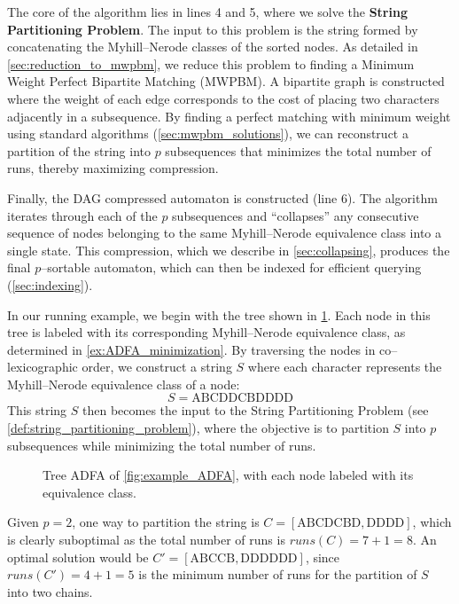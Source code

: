The core of the algorithm lies in lines 4 and 5, where we solve the \textbf{String Partitioning Problem}. The input to this problem is the string formed by concatenating the Myhill--Nerode classes of the sorted nodes. As detailed in \cref{sec:reduction_to_mwpbm}, we reduce this problem to finding a Minimum Weight Perfect Bipartite Matching (MWPBM). A bipartite graph is constructed where the weight of each edge corresponds to the cost of placing two characters adjacently in a subsequence. By finding a perfect matching with minimum weight using standard algorithms (\cref{sec:mwpbm_solutions}), we can reconstruct a partition of the string into $p$ subsequences that minimizes the total number of runs, thereby maximizing compression.

Finally, the DAG compressed automaton is constructed (line 6). The algorithm iterates through each of the $p$ subsequences and ``collapses'' any consecutive sequence of nodes belonging to the same Myhill--Nerode equivalence class into a single state. This compression, which we describe in \cref{sec:collapsing}, produces the final $p$--sortable automaton, which can then be indexed for efficient querying (\cref{sec:indexing}).

\begin{example} \label{ex:string_example}
    In our running example, we begin with the tree shown in \cref{fig:mn-compressed-tree}. Each node in this tree is labeled with its corresponding Myhill--Nerode equivalence class, as determined in \cref{ex:ADFA_minimization}. By traversing the nodes in co--lexicographic order, we construct a string $S$ where each character represents the Myhill--Nerode equivalence class of a node:
    \[
        S = \text{ABCDDCBDDDD}
    \]
    This string $S$ then becomes the input to the String Partitioning Problem (see \cref{def:string_partitioning_problem}), where the objective is to partition $S$ into $p$ subsequences while minimizing the total number of runs.

    \begin{figure}[H]
        \centering
        
        \caption{Tree ADFA of \cref{fig:example_ADFA}, with each node labeled with its equivalence class.}
        \label{fig:mn-compressed-tree}
    \end{figure}

    Given $p = 2$, one way to partition the string is $C = [\text{ABCDCBD}, \text{DDDD}]$, which is clearly suboptimal as the total number of runs is $runs(C) = 7 + 1 = 8$.
    An optimal solution would be $C' = [\text{ABCCB}, \text{DDDDDD}]$, since $runs(C') = 4 + 1 = 5$ is the minimum number of runs for the partition of $S$ into two chains.
    
\end{example}